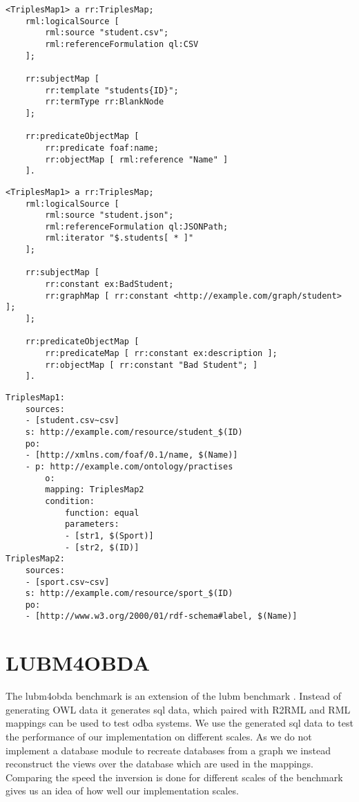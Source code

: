 \begin{lstlisting}[caption={Example RML mapping with data being stored only in a blank node}, label={lst:blank_node_data_store_mapping}, captionpos=b, basicstyle=\small, frame=single]
<TriplesMap1> a rr:TriplesMap;
    rml:logicalSource [
        rml:source "student.csv";
        rml:referenceFormulation ql:CSV
    ];

    rr:subjectMap [ 
        rr:template "students{ID}";
        rr:termType rr:BlankNode
    ];

    rr:predicateObjectMap [ 
        rr:predicate foaf:name; 
        rr:objectMap [ rml:reference "Name" ]
    ].
\end{lstlisting}

\begin{lstlisting}[caption={Example RML mapping with no references}, label={lst:no_references_mapping}, captionpos=b, basicstyle=\small, frame=single]
<TriplesMap1> a rr:TriplesMap;
    rml:logicalSource [ 
        rml:source "student.json";
        rml:referenceFormulation ql:JSONPath;
        rml:iterator "$.students[ * ]"
    ];

    rr:subjectMap [ 
        rr:constant ex:BadStudent;  
        rr:graphMap [ rr:constant <http://example.com/graph/student> ];
    ];

    rr:predicateObjectMap [ 
        rr:predicateMap [ rr:constant ex:description ]; 
        rr:objectMap [ rr:constant "Bad Student"; ]
    ].
\end{lstlisting}

\begin{lstlisting}[caption={Example YARRRML mapping with data only being used in a join condition}, label={lst:only_join}, captionpos=b, basicstyle=\small, frame=single]
TriplesMap1:
    sources:
    - [student.csv~csv]
    s: http://example.com/resource/student_$(ID)
    po:
    - [http://xmlns.com/foaf/0.1/name, $(Name)]
    - p: http://example.com/ontology/practises
        o:
        mapping: TriplesMap2
        condition:
            function: equal
            parameters:
            - [str1, $(Sport)]
            - [str2, $(ID)]
TriplesMap2:
    sources:
    - [sport.csv~csv]
    s: http://example.com/resource/sport_$(ID)
    po:
    - [http://www.w3.org/2000/01/rdf-schema#label, $(Name)]
\end{lstlisting}

\section{LUBM4OBDA}
\label{section:lubm4obda}
The \acrfull{lubm4obda} benchmark \citep{LUBM4OBDA} is an extension of the \acrfull{lubm} benchmark \citep{LUBM}. Instead of generating OWL data it generates sql data, which paired with R2RML and RML mappings can be used to test \acrshort{odba} systems. We use the generated sql data to test the performance of our implementation on different scales. As we do not implement a database module to recreate databases from a graph we instead reconstruct the views over the database which are used in the mappings. Comparing the speed the inversion is done for different scales of the benchmark gives us an idea of how well our implementation scales.


